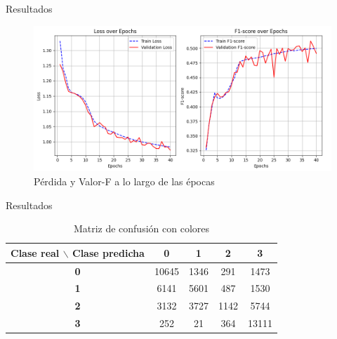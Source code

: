 \documentclass{beamer}
\begin{document}
    \begin{frame}{Resultados}
        \begin{figure}[h]
            \centering
            \includegraphics[width=1\textwidth]{loss-f1-epochs.png}
            \caption{Pérdida y Valor-F a lo largo de las épocas}
            \label{fig:mi_imagen}
        \end{figure}
    \end{frame}
    \begin{frame}{Resultados}
        \begin{table}[h!]
            \centering
            \begin{tabular}{c|cccc}
                \rowcolor{gray!30} \textbf{Clase real $\backslash$ Clase predicha} & \textbf{0} & \textbf{1} & \textbf{2} & \textbf{3} \\
                \hline
                \textbf{0} & \cellcolor{yellow!50}10645 & 1346 & 291 & 1473 \\
                \textbf{1} & 6141 & \cellcolor{yellow!50}5601 & 487 & 1530 \\
                \textbf{2} & 3132 & 3727 & \cellcolor{yellow!50}1142 & 5744 \\
                \textbf{3} & 252 & 21 & 364 & \cellcolor{yellow!50}13111 \\
            \end{tabular}
            \caption{Matriz de confusión con colores}
        \end{table}
    \end{frame}
\end{document}
